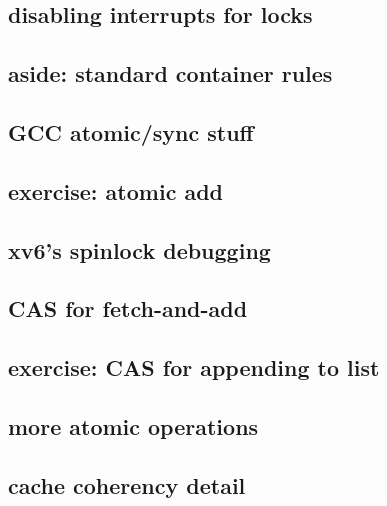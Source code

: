 \subsection{disabling interrupts for locks}


%

\subsection{aside: standard container rules}


\subsection{GCC atomic/sync stuff}


\subsection{exercise: atomic add}

\subsection{xv6's spinlock debugging}



\subsection{CAS for fetch-and-add}


\subsection{exercise: CAS for appending to list}



\subsection{more atomic operations}



\subsection{cache coherency detail}
